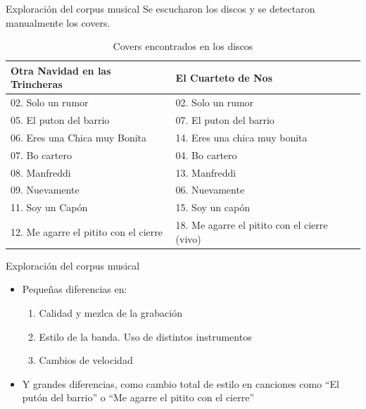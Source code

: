 \documentclass{beamer}
\begin{document}
\begin{frame}{Exploración del corpus musical}
    Se escucharon los discos y se detectaron manualmente los covers.
    {\small\begin{table}[!h]
    \centering
    \begin{tabular}{|l|l|}
    \hline
    \textbf{Otra Navidad en las Trincheras}  & \textbf{El Cuarteto de Nos}              \\
    \hline
    02. Solo un rumor       & 02. Solo un rumor       \\
    \color{red} 05. El puton del barrio & \color{red} 07. El puton del barrio \\
    06. Eres una Chica muy Bonita   & 14. Eres una chica muy bonita \\
    07. Bo cartero          & 04. Bo cartero          \\
    08. Manfreddi       &   13. Manfreddi   \\
    09. Nuevamente          & 06. Nuevamente    \\
    11. Soy un Capón    & 15. Soy un capón  \\
    \color{red} 12. Me agarre el pitito con el cierre & \color{red} 18. Me agarre el pitito con el cierre (vivo) \\
    \hline
    \end{tabular}
    \caption{Covers encontrados en los discos}
    \label{canciones}
    \end{table}}
\end{frame}

\begin{frame}{Exploración del corpus musical}
    \begin{itemize}
        \item Pequeñas diferencias en:
        \begin{enumerate}
            \item Calidad y mezlca de la grabación
            \item Estilo de la banda. Uso de distintos instrumentos
            \item Cambios de velocidad
        \end{enumerate}
    \vspace{1cm}
    \item Y grandes diferencias, como cambio total de estilo en canciones como ``El putón del barrio'' o ``Me agarre el pitito con el cierre''
    \end{itemize}
\end{frame}
\end{document}
